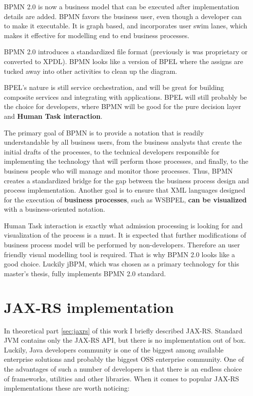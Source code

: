 	\cite{ms_bpmn_bpel}
	BPMN 2.0 is now a business model that can be executed after implementation details are added. BPMN favors the business
	user, even though a developer can  to make it executable. It is graph based, and
	incorporates user swim lanes, which makes it effective for modelling end to end business processes. 
	
	BPMN 2.0 introduces a standardized file format (previously is was proprietary or converted to XPDL). BPMN looks like a
	version of BPEL where the assigns are tucked away into other activities to clean up the diagram.

	BPEL's nature is still service orchestration, and will be great for building composite services and
	integrating with applications. BPEL will still probably be the choice for developers, where BPMN will be good for the
	pure decision layer and \textbf{Human Task interaction}.
	
	\cite[p.~1]{bpmn}
	The primary goal of BPMN is to provide a notation that is readily understandable by all business users, from the
	business analysts that create the initial drafts of the processes, to the technical developers responsible for
	implementing the technology that will perform those processes, and finally, to the business people who will manage and
	monitor those processes. Thus, BPMN creates a standardized bridge for the gap between the business process design and
	process implementation.
	Another goal  is to ensure that XML languages designed for the execution of \textbf{business processes}, such as
	\gls{WSBPEL}, \textbf{can be visualized} with a business-oriented notation.
	
	Human Task interaction is exactly what admission processing is looking for and visualization of the process is a must.
	It is expected that further modifications of business process model will be performed by non-developers. Therefore an
	user friendly visual modelling tool is required. That is why BPMN 2.0 looks like a good choice. Luckily jBPM, which was
	chosen as a primary technology for this master's thesis, fully implements BPMN 2.0 standard.
	
	\section{JAX-RS implementation}
	
	In theoretical part \ref{sec:jaxrs} of this work I briefly described JAX-RS. Standard JVM contains only the JAX-RS
	API, but there is no implementation out of box. Luckily, Java developers community is one of the biggest among
	available enterprise solutions and probably the biggest \gls{OSS} enterprise community.
	One of the advantages of such a number of developers is that there is an endless choice of frameworks, utilities and
	other libraries. When it comes to popular JAX-RS implementations these are worth noticing:
	
